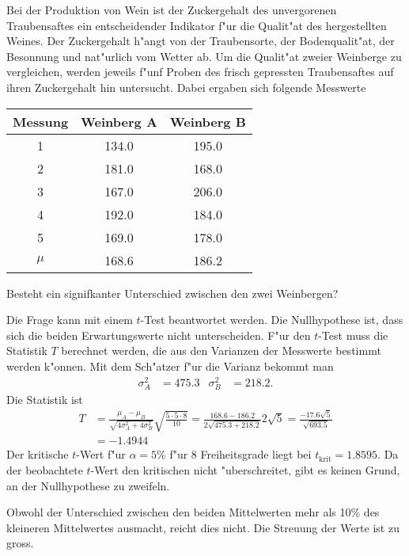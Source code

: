Bei der Produktion von Wein ist der Zuckergehalt des unvergorenen
Traubensaftes ein entscheidender Indikator f"ur die Qualit"at des
hergestellten Weines. Der Zuckergehalt h"angt von der Traubensorte,
der Bodenqualit"at, der Besonnung und nat"urlich vom Wetter ab.
Um die Qualit"at zweier Weinberge zu vergleichen, werden jeweils
f"unf Proben
des frisch gepressten Traubensaftes auf ihren Zuckergehalt hin
untersucht. Dabei ergaben sich folgende Messwerte

\begin{center}
\begin{tabular}{|c|cc|}
\hline
Messung&Weinberg A&Weinberg B\\
\hline
1&134.0&195.0\\
2&181.0&168.0\\
3&167.0&206.0\\
4&192.0&184.0\\
5&169.0&178.0\\
\hline
$\mu$ &168.6&186.2\\
\hline
\end{tabular}
\end{center}
Besteht ein signifkanter Unterschied zwischen den zwei Weinbergen?

\begin{loesung}
Die Frage kann mit einem $t$-Test beantwortet werden.
Die Nullhypothese ist, dass sich die beiden Erwartungswerte
nicht unterscheiden. F"ur den $t$-Test muss die Statistik $T$
berechnet werden, die aus den Varianzen der Messwerte 
bestimmt werden k"onnen. Mit dem Sch"atzer f"ur die Varianz
bekommt man
\begin{align*}
\sigma_A^2&=475.3&
\sigma_B^2&=218.2.
\end{align*}
Die Statistik ist
\begin{align*}
T&=\frac{\mu_A-\mu_B}{\sqrt{4\sigma_A^2+4\sigma_B^2}}\sqrt{\frac{5\cdot5\cdot 8}{10}}
=\frac{168.6-186.2}{2\sqrt{475.3+218.2}}2\sqrt{5}
=\frac{-17.6\sqrt{5}}{\sqrt{693.5}}
\\
&=-1.4944
\end{align*}
Der kritische $t$-Wert f"ur $\alpha=5\%$ f"ur $8$ Freiheitsgrade liegt
bei $t_{\text{krit}}=1.8595$. Da der beobachtete $t$-Wert den kritischen
nicht "uberschreitet, gibt es keinen Grund, an der Nullhypothese
zu zweifeln.

Obwohl der Unterschied zwischen den beiden Mittelwerten mehr als 10\%
des kleineren Mittelwertes ausmacht, reicht dies nicht. Die Streuung
der Werte ist zu gross.
\end{loesung}
